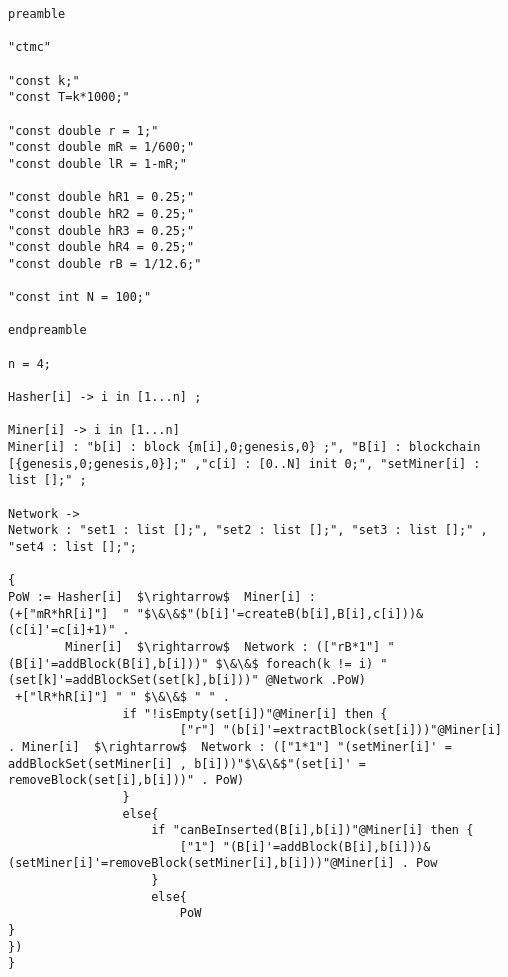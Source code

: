 \begin{lstlisting}[style=chor-color,caption={Choreographic language for the Proof of Work Bitcoin Protocol.},captionpos=b,label={ex3-code}]
preamble

"ctmc"

"const k;"
"const T=k*1000;"

"const double r = 1;"
"const double mR = 1/600;"
"const double lR = 1-mR;"

"const double hR1 = 0.25;"
"const double hR2 = 0.25;"
"const double hR3 = 0.25;"
"const double hR4 = 0.25;"
"const double rB = 1/12.6;"

"const int N = 100;"

endpreamble

n = 4;

Hasher[i] -> i in [1...n] ;

Miner[i] -> i in [1...n]
Miner[i] : "b[i] : block {m[i],0;genesis,0} ;", "B[i] : blockchain [{genesis,0;genesis,0}];" ,"c[i] : [0..N] init 0;", "setMiner[i] : list [];" ;

Network ->
Network : "set1 : list [];", "set2 : list [];", "set3 : list [];" , "set4 : list [];"; 
	
{
PoW := Hasher[i]  $\rightarrow$  Miner[i] :
(+["mR*hR[i]"]  " "$\&\&$"(b[i]'=createB(b[i],B[i],c[i]))&(c[i]'=c[i]+1)" . 
		Miner[i]  $\rightarrow$  Network : (["rB*1"] "(B[i]'=addBlock(B[i],b[i]))" $\&\&$ foreach(k != i) "(set[k]'=addBlockSet(set[k],b[i]))" @Network .PoW)
 +["lR*hR[i]"] " " $\&\&$ " " .
 				if "!isEmpty(set[i])"@Miner[i] then { 
  						["r"] "(b[i]'=extractBlock(set[i]))"@Miner[i] . Miner[i]  $\rightarrow$  Network : (["1*1"] "(setMiner[i]' = addBlockSet(setMiner[i] , b[i]))"$\&\&$"(set[i]' = removeBlock(set[i],b[i]))" . PoW) 
 				}
 				else{
 					if "canBeInserted(B[i],b[i])"@Miner[i] then { 
 						["1"] "(B[i]'=addBlock(B[i],b[i]))&(setMiner[i]'=removeBlock(setMiner[i],b[i]))"@Miner[i] . Pow 
 					}
 					else{
 						PoW
}
})
} 	
\end{lstlisting}


